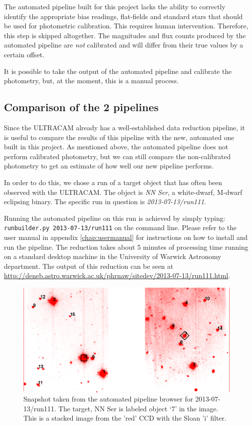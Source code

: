 The automated pipeline built for this project lacks the ability to correctly identify the appropriate bias readings, flat-fields and standard stars that should be used for photometric calibration. This requires human intervention. Therefore, this step is skipped altogether. The magnitudes and flux counts produced by the automated pipeline are \emph{not} calibrated and will differ from their true values by a certain offset.

It is possible to take the output of the automated pipeline and calibrate the photometry, but, at the moment, this is a manual process. 

\subsection{Comparison of the 2 pipelines}
Since the ULTRACAM already has a well-established data reduction pipeline, it is useful to compare the results of this pipeline with the new, automated one built in this project. As mentioned above, the automated pipeline does not perform calibrated photometry, but we can still compare the non-calibrated photometry to get an estimate of how well our new pipeline performs.

In order to do this, we chose a run of a target object that has often been observed with the ULTRACAM. The object is \emph{NN Ser}, a white-dwarf, M-dwarf eclipsing binary. The specific run in question is \emph{2013-07-13/run111}.

Running the automated pipeline on this run is achieved by simply typing: \texttt{runbuilder.py 2013-07-13/run111} on the command line. Please refer to the user manual in appendix \ref{chap:usermanual} for instructions on how to install and run the pipeline.  The reduction takes about 5 minutes of processing time running on a standard desktop machine in the University of Warwick Astronomy department. The output of this reduction can be seen at \url{http://deneb.astro.warwick.ac.uk/phrnaw/sitedev/2013-07-13/run111.html}.

\begin{figure}
\centering
\includegraphics[width=120mm]{images/2013-07-13-run111-r-withlabels.png}
\caption{Snapshot taken from the automated pipeline browser for 2013-07-13/run111. The target, {NN Ser} is labeled object `7' in the image. This is a stacked image from the 'red' CCD with the Sloan 'i' filter. }
\label{fig:nnserfield}
\end{figure}

